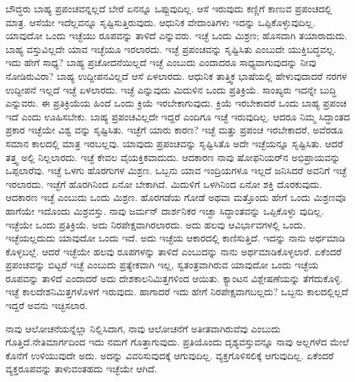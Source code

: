 ಬೌದ್ಧರು ಬಾಹ್ಯ ಪ್ರಪಂಚವನ್ನಲ್ಲದೆ ಬೇರೆ ಏನನ್ನೂ ಒಪ್ಪುವುದಿಲ್ಲ. ಆಸೆ ಇರುವುದು ಕಣ್ಣಿಗೆ ಕಾಣುವ ಪ್ರಪಂಚದಲ್ಲಿ ಮಾತ್ರ. ಆಸೆಯೇ ಇದೆಲ್ಲವನ್ನೂ ಸೃಷ್ಟಿಸುತ್ತಿರುವುದು. ಆಧುನಿಕ ವೇದಾಂತಿಗಳು ಇದನ್ನು ಒಪ್ಪಿಕೊಳ್ಳುವುದಿಲ್ಲ. ಯಾವುದೋ ಒಂದು ಇಚ್ಛೆಯು ರೂಪವನ್ನು ತಾಳಿದೆ ಎನ್ನುವರು. ಇಚ್ಛೆ ಒಂದು ಮಿಶ್ರಣ; ಹೊಸದಾಗಿ ತಯಾರಾದುದು. ಬಾಹ್ಯ ವಸ್ತುವಿಲ್ಲದೇ ಯಾವ ಇಚ್ಛೆಯೂ ಇರಲಾರದು. ಇಚ್ಛೆ ಪ್ರಪಂಚವನ್ನು ಸೃಷ್ಟಿಸಿತು ಎಂಬುದೇ ಯುಕ್ತಿಬದ್ಧವಲ್ಲ. ಇದು ಹೇಗೆ ಸಾಧ್ಯ? ಬಾಹ್ಯ ಪ್ರಚೋದನೆಯಿಲ್ಲದೆ ಇಚ್ಛೆ ಎಂಬುದು ಎಂದಾದರೂ ಸಾಧ್ಯವಾಗುವುದನ್ನು ನೀವು ನೋಡಿರುವಿರಾ? ಬಾಹ್ಯ ಉದ್ದೀಪನವಿಲ್ಲದೆ ಆಸೆ ಏಳಲಾರದು. ಆಧುನಿಕ ತಾತ್ತ್ವಿಕ ಭಾಷೆಯಲ್ಲಿ ಹೇಳುವುದಾದರೆ ನರಗಳ ಉದ್ದೀಪನೆ ಇಲ್ಲದೆ ಇಚ್ಛೆ ಏಳಲಾರದು. ಇಚ್ಛೆ ಎನ್ನುವುದು ಮಿದುಳಿನ ಒಂದು ಪ್ರತಿಕ್ರಿಯೆ. ಸಾಂಖ್ಯರು ಇದನ್ನೇ ಬುದ್ಧಿ ಎನ್ನುವರು. ಈ ಪ್ರತಿಕ್ರಿಯೆಯ ಹಿಂದೆ ಒಂದು ಕ್ರಿಯೆ ಇರಬೇಕಾಗುವುದು. ಕ್ರಿಯೆ ಇರಬೇಕಾದರೆ ಒಂದು ಬಾಹ್ಯ ಪ್ರಪಂಚ ಇದೆ ಎಂದು ಊಹಿಸಬೇಕು. ಬಾಹ್ಯ ಪ್ರಪಂಚವಿಲ್ಲದೇ ಇದ್ದರೆ ಎಂದಿಗೂ ಇಚ್ಛೆ ಇರುವುದಿಲ್ಲ. ಆದರೂ ನಿಮ್ಮ ಸಿದ್ಧಾಂತದ ಪ್ರಕಾರ ಇಚ್ಛೆಯೇ ವಿಶ್ವ ವನ್ನು ಸೃಷ್ಟಿಸಿತು. ಇಚ್ಛೆಗೆ ಯಾರು ಕಾರಣ? ಇಚ್ಛೆ ಮತ್ತು ಪ್ರಪಂಚ ಇರಬೇಕಾದರೆ, ಅವೆರಡೂ ಸಮಾನ ಕಾಲದಲ್ಲಿ ಮಾತ್ರ ಇರಬಲ್ಲವು. ಯಾವುದು ಪ್ರಪಂಚವನ್ನು ಸೃಷ್ಟಿಸಿತೊ ಅದೇ ಇಚ್ಛೆಯನ್ನೂ ಸೃಷ್ಟಿಸಿತು. ಆದರೆ ತತ್ತ್ವ ಅಲ್ಲಿ ನಿಲ್ಲಲಾರದು. ಇಚ್ಛೆ ಕೇವಲ ವೈಯಕ್ತಿಕವಾದುದು. ಆದಕಾರಣ ನಾವು ಷೋಫನಿಯರ್​ನ ಅಭಿಪ್ರಾಯವನ್ನು ಒಪ್ಪಲಾರೆವು. ಇಚ್ಛೆ ಒಳಗು ಹೊರಗುಗಳ ಮಿಶ್ರಣ. ಒಬ್ಬನು ಯಾವ ಇಂದ್ರಿಯಗಳೂ ಇಲ್ಲದೆ ಜನಿಸಿದರೆ ಅವನಿಗೆ ಇಚ್ಛೆ ಇರಲಾರದು. ಇಚ್ಛೆಗೆ ಹೊರಗಿನಿಂದ ಏನೋ ಬೇಕಾಗಿದೆ. ಮಿದುಳಿಗೆ ಒಳಗಿನಿಂದ ಏನೋ ಶಕ್ತಿ ದೊರಕುವುದು. ಆದಕಾರಣ ಇಚ್ಛೆ ಎಂಬುದು ಒಂದು ಮಿಶ್ರಣ. ಹೊರಗಡೆಯ ಗೋಡೆ ಅಥವಾ ಮತ್ತೊಂದು ಹೇಗೆ ಒಂದು ಮಿಶ್ರಣವೊ ಹಾಗೆಯೇ ಇದೊಂದು ಮಿಶ್ರವಸ್ತು. ನಾವು ಜರ್ಮನ್​ ದಾರ್ಶನಿಕರ ಇಚ್ಛಾ ಸಿದ್ಧಾಂತವನ್ನು ಒಪ್ಪಿಕೊಳ್ಳು ವುದಿಲ್ಲ. ಇಚ್ಛೆಯೇ ಒಂದು ಪ್ರತಿಕ್ರಿಯೆ. ಅದು ನಿರಪೇಕ್ಷವಾಗಿರಲಾರದು. ಅದು ಹಲವು ಆವಿರ್ಭಾವಗಳಲ್ಲಿ ಒಂದು. ಇಚ್ಛೆಯಲ್ಲದುದು ಯಾವುದೋ ಒಂದು ಇದೆ. ಅದು ಇಚ್ಛೆಯ ಆಕಾರದಲ್ಲಿ ಕಾಣಿಸುತ್ತಿದೆ. ಇದನ್ನು ನಾನು ಅರ್ಥಮಾಡಿ ಕೊಳ್ಳಬಲ್ಲೆ. ಆದರೆ ಇಚ್ಛೆಯೇ ಹಲವು ರೂಪಗಳನ್ನು ತಾಳಿದೆ ಎಂಬುದನ್ನು ನಾನು ಅರ್ಥಮಾಡಿಕೊಳ್ಳಲಾರೆ. ಏಕೆಂದರೆ ಪ್ರಪಂಚವನ್ನು ಬಿಟ್ಟರೆ ಇಚ್ಛೆ ಎಂಬುದು ಪ್ರತ್ಯೇಕವಾಗಿ ಇಲ್ಲ, ಸ್ವತಂತ್ರವಾಗಿರುವ ಯಾವುದೋ ಒಂದು ಇಚ್ಛೆಯ ರೂಪವನ್ನು ತಾಳಿದೆ ಎಂದಾದರೆ ಅದು ದೇಶಕಾಲನಿಮಿತ್ತಗಳಿಂದ ಆಯಿತು. ಕ್ಯಾಂಟನ ವಿಶ್ಲೇಷಣೆಯನ್ನು ತೆಗೆದುಕೊಳ್ಳಿ. ಇಚ್ಛೆ ಕಾಲದೇಶನಿಮಿತ್ತಗಳೊಳಗೆ ಇರುವುದು. ಹಾಗಾದರೆ ಇದು ಹೇಗೆ ನಿರಪೇಕ್ಷವಾಗಬಲ್ಲದು? ಒಬ್ಬನು ಕಾಲದಲ್ಲಿಲ್ಲದೆ ಇದ್ದರೆ ಅವನು ಇಚ್ಛಿಸಲಾರ.

ನಾವು ಆಲೋಚನೆಯನ್ನೆಲ್ಲಾ ನಿಲ್ಲಿಸಿದಾಗ, ನಾವು ಆಲೋಚನೆಗೆ ಅತೀತವಾಗಿರುವೆವು ಎಂಬುದು ಗೊತ್ತಿದೆ.ನೇತಿಮಾರ್ಗದಿಂದ ಇದು ನಮಗೆ ಗೊತ್ತಾಗುವುದು. ಪ್ರತಿಯೊಂದು ದೃಶ್ಯವಸ್ತುವನ್ನೂ ನಾವು ಅಲ್ಲಗಳೆದ ಮೇಲೆ ಕೊನೆಗೆ ಉಳಿಯುವುದೇ ಅದು. ಅದನ್ನು ವಿವರಿಸುವುದಕ್ಕೆ ಆಗುವುದಿಲ್ಲ. ವ್ಯಕ್ತಗೊಳಿಸಲಿಕ್ಕೆ ಆಗುವುದಿಲ್ಲ. ಏಕೆಂದರೆ ವ್ಯಕ್ತರೂಪವನ್ನು ತಾಳುವಂತಹದು ಇಚ್ಛೆಯೇ ಆಗಿದೆ.


